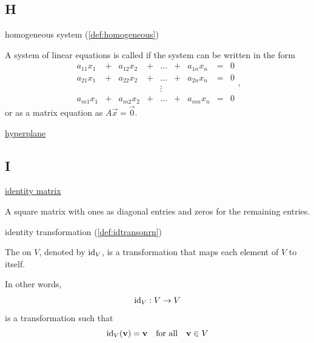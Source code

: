 \documentclass{ximera}
\begin{document}
\subsection*{H}


homogeneous system (\ref{def:homogeneous})
\begin{expandable}{}{}
    A system of linear equations is called  if the system can be written in the form
$$\begin{array}{ccccccccc}
      a_{11}x_1 &+ &a_{12}x_2&+&\ldots&+&a_{1n}x_n&= &0 \\
	 a_{21}x_1 &+ &a_{22}x_2&+&\ldots&+&a_{2n}x_n&= &0 \\
     &&&&\vdots&&&& \\
     a_{m1}x_1 &+ &a_{m2}x_2&+&\ldots&+&a_{mn}x_n&= &0
    \end{array},$$
or as a matrix equation as $A \vec{x} = \vec{0}$.
\end{expandable}

\href{https://ximera.osu.edu/linearalgebradzv3/LinearAlgebraInteractiveIntro/RRN-0030/main}{hyperplane}

\subsection*{I}

\href{https://ximera.osu.edu/linearalgebradzv3/LinearAlgebraInteractiveIntro/MAT-0020/main}{identity matrix}
\begin{expandable}{}{}
    A square matrix with ones as diagonal entries and zeros for the remaining entries.
\end{expandable}

identity transformation (\ref{def:idtransonrn})
\begin{expandable}{}{}
    The  on $V$, denoted by $\text{id}_V$, is a transformation that maps each element of $V$ to itself.

In other words,
$$\text{id}_V:V\rightarrow V$$ is a transformation such that $$\text{id}_V(\mathbf{v})=\mathbf{v}\quad\text{for all}\quad \mathbf{v} \in V$$
\end{expandable}
\end{document}
